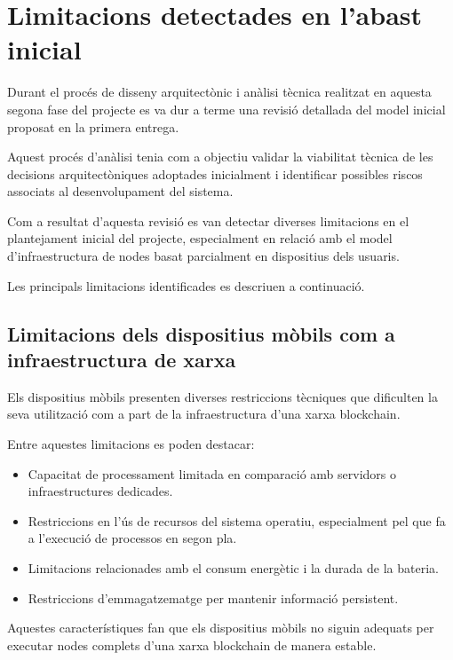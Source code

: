\documentclass[12pt,a4paper]{article}
\begin{document}

\section{Limitacions detectades en l'abast inicial}

Durant el procés de disseny arquitectònic i anàlisi tècnica realitzat en aquesta segona fase del projecte es va dur a terme una revisió detallada del model inicial proposat en la primera entrega.

Aquest procés d'anàlisi tenia com a objectiu validar la viabilitat tècnica de les decisions arquitectòniques adoptades inicialment i identificar possibles riscos associats al desenvolupament del sistema.

Com a resultat d'aquesta revisió es van detectar diverses limitacions en el plantejament inicial del projecte, especialment en relació amb el model d'infraestructura de nodes basat parcialment en dispositius dels usuaris.

Les principals limitacions identificades es descriuen a continuació.

\subsection{Limitacions dels dispositius mòbils com a infraestructura de xarxa}

Els dispositius mòbils presenten diverses restriccions tècniques que dificulten la seva utilització com a part de la infraestructura d'una xarxa blockchain.

Entre aquestes limitacions es poden destacar:

\begin{itemize}
\item Capacitat de processament limitada en comparació amb servidors o infraestructures dedicades.
\item Restriccions en l'ús de recursos del sistema operatiu, especialment pel que fa a l'execució de processos en segon pla.
\item Limitacions relacionades amb el consum energètic i la durada de la bateria.
\item Restriccions d'emmagatzematge per mantenir informació persistent.
\end{itemize}

Aquestes característiques fan que els dispositius mòbils no siguin adequats per executar nodes complets d'una xarxa blockchain de manera estable.
\end{document}

